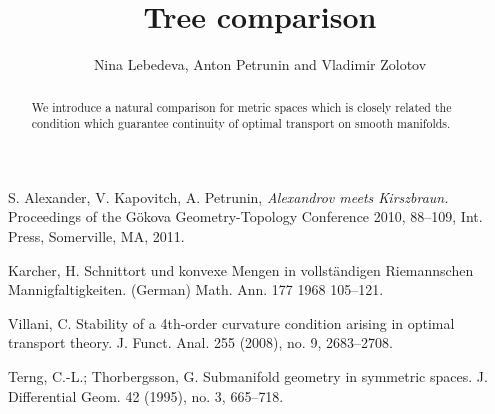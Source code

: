 \documentclass{article}
\begin{document}
\title{Tree comparison}
\author{Nina Lebedeva, Anton Petrunin and Vladimir Zolotov}


\newcommand{\Addresses}{{\bigskip\footnotesize
Anton Petrunin, \par\nopagebreak\textsc{Department of Mathematics, PSU, University Park, PA 16802, USA}
\par\nopagebreak
\textit{Email}: \texttt{petrunin@math.psu.edu}

\medskip
 
...
}}


\date{}

\maketitle

\begin{abstract}
We introduce a natural comparison for metric spaces which is closely related  the condition which guarantee continuity of optimal transport on smooth manifolds. 
\end{abstract}







\begin{thebibliography}{52}
 S. Alexander, V. Kapovitch, A. Petrunin, 
\emph{Alexandrov meets Kirszbraun.} 
Proceedings of the Gökova Geometry-Topology Conference 2010, 88--109, Int. Press, Somerville, MA, 2011.

Karcher, H.
Schnittort und konvexe Mengen in vollständigen Riemannschen Mannigfaltigkeiten. (German)
Math. Ann. 177 1968 105--121.

 Villani, C. Stability of a 4th-order curvature condition arising in optimal transport theory. J. Funct. Anal. 255 (2008), no. 9, 2683--2708.

 Terng, C.-L.; Thorbergsson, G. Submanifold geometry in symmetric spaces. J. Differential Geom. 42 (1995), no. 3, 665--718.
 
\end{thebibliography}
\end{document}
